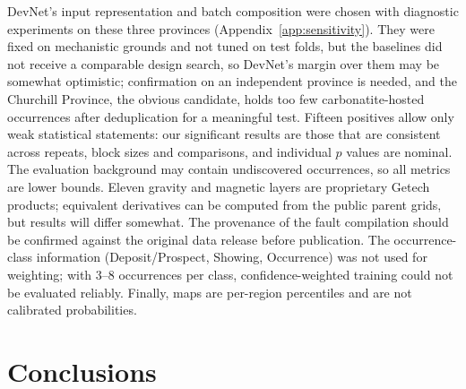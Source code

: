 \documentclass[pdflatex,sn-apa]{sn-jnl}
\begin{document}
DevNet's input representation and batch composition were chosen with diagnostic experiments on these three provinces (Appendix~\ref{app:sensitivity}). They were fixed on mechanistic grounds and not tuned on test folds, but the baselines did not receive a comparable design search, so DevNet's margin over them may be somewhat optimistic; confirmation on an independent province is needed, and the Churchill Province, the obvious candidate, holds too few carbonatite-hosted occurrences after deduplication for a meaningful test. Fifteen positives allow only weak statistical statements: our significant results are those that are consistent across repeats, block sizes and comparisons, and individual $p$ values are nominal. The evaluation background may contain undiscovered occurrences, so all metrics are lower bounds. Eleven gravity and magnetic layers are proprietary Getech products; equivalent derivatives can be computed from the public parent grids, but results will differ somewhat. The provenance of the fault compilation should be confirmed against the original data release before publication. The occurrence-class information (Deposit/Prospect, Showing, Occurrence) was not used for weighting; with 3--8 occurrences per class, confidence-weighted training could not be evaluated reliably. Finally, maps are per-region percentiles and are not calibrated probabilities.

\section{Conclusions}\label{sec:conclusions}
\end{document}
